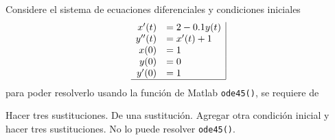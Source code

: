 \begin{pregunta}
\begin{cuerpo}
Considere el sistema de ecuaciones diferenciales y condiciones iniciales
$$
\begin{array}{rl|}
x'(t)	&=2-0.1y(t) \\
y''(t)	&= x'(t)+1 	\\
x(0)&	=1\\
y(0)&	=0\\
y'(0)&	=1\\\hline
\end{array}
$$
para poder resolverlo usando la funci\'on de Matlab \texttt{ode45()}, se requiere de
\end{cuerpo}

\begin{multicols}{2}
\begin{alternativas}
{Hacer tres sustituciones.}
{De una sustituci\'on.}
{Agregar otra condici\'on inicial y hacer tres sustituciones.}
{No lo puede resolver \texttt{ode45()}.}
\end{alternativas}
\end{multicols}
\justificacion{0cm}
\end{pregunta}